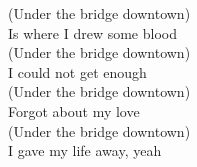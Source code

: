 (Under the bridge downtown) \\
Is where I drew some blood \\
(Under the bridge downtown) \\
I could not get enough \\
(Under the bridge downtown) \\
Forgot about my love \\
(Under the bridge downtown) \\
I gave my life away, yeah \\

